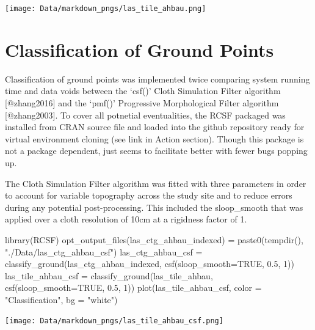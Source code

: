 \documentclass[
]{article}
\newenvironment{Shaded}{\begin{snugshade}}{\end{snugshade}}
\newcommand{\AttributeTok}[1]{\textcolor[rgb]{0.77,0.63,0.00}{#1}}
\newcommand{\ConstantTok}[1]{\textcolor[rgb]{0.00,0.00,0.00}{#1}}
\newcommand{\DecValTok}[1]{\textcolor[rgb]{0.00,0.00,0.81}{#1}}
\newcommand{\FloatTok}[1]{\textcolor[rgb]{0.00,0.00,0.81}{#1}}
\newcommand{\FunctionTok}[1]{\textcolor[rgb]{0.00,0.00,0.00}{#1}}
\newcommand{\NormalTok}[1]{#1}
\newcommand{\OtherTok}[1]{\textcolor[rgb]{0.56,0.35,0.01}{#1}}
\newcommand{\StringTok}[1]{\textcolor[rgb]{0.31,0.60,0.02}{#1}}
\begin{document}
\texttt{[image: Data/markdown\_pngs/las\_tile\_ahbau.png]}

\hypertarget{classification-of-ground-points}{%
\section{Classification of Ground
Points}\label{classification-of-ground-points}}

Classification of ground points was implemented twice comparing system
running time and data voids between the `csf()' Cloth Simulation Filter
algorithm {[}@zhang2016{]} and the `pmf()' Progressive Morphological
Filter algorithm {[}@zhang2003{]}. To cover all potnetial eventualities,
the RCSF packaged was installed from CRAN source file and loaded into
the github repository ready for virtual environment cloning (see link in
Action section). Though this package is not a package dependent, just
seems to facilitate better with fewer bugs popping up.

The Cloth Simulation Filter algorithm was fitted with three parameters
in order to account for variable topography across the study site and to
reduce errors during any potential post-processing. This included the
sloop\_smooth that was applied over a cloth resolution of 10cm at a
rigidness factor of 1.

\begin{Shaded}
\begin{Highlighting}[]
\FunctionTok{library}\NormalTok{(RCSF)}
\FunctionTok{opt\_output\_files}\NormalTok{(las\_ctg\_ahbau\_indexed) }\OtherTok{=}  \FunctionTok{paste0}\NormalTok{(}\FunctionTok{tempdir}\NormalTok{(), }\StringTok{"./Data/las\_ctg\_ahbau\_csf"}\NormalTok{)}
\NormalTok{las\_ctg\_ahbau\_csf }\OtherTok{=} \FunctionTok{classify\_ground}\NormalTok{(las\_ctg\_ahbau\_indexed, }\FunctionTok{csf}\NormalTok{(}\AttributeTok{sloop\_smooth=}\ConstantTok{TRUE}\NormalTok{, }\FloatTok{0.5}\NormalTok{, }\DecValTok{1}\NormalTok{))}
\NormalTok{las\_tile\_ahbau\_csf }\OtherTok{=} \FunctionTok{classify\_ground}\NormalTok{(las\_tile\_ahbau, }\FunctionTok{csf}\NormalTok{(}\AttributeTok{sloop\_smooth=}\ConstantTok{TRUE}\NormalTok{, }\FloatTok{0.5}\NormalTok{, }\DecValTok{1}\NormalTok{))}
\FunctionTok{plot}\NormalTok{(las\_tile\_ahbau\_csf, }\AttributeTok{color =} \StringTok{"Classification"}\NormalTok{, }\AttributeTok{bg =} \StringTok{"white"}\NormalTok{) }
\end{Highlighting}
\end{Shaded}

\texttt{[image: Data/markdown\_pngs/las\_tile\_ahbau\_csf.png]}
\end{document}

